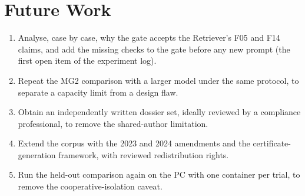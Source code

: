 \section{Future Work}
\begin{enumerate}[itemsep=1pt]
\item Analyse, case by case, why the gate accepts the Retriever's F05 and F14 claims, and add the
missing checks to the gate before any new prompt (the first open item of the experiment log).
\item Repeat the MG2 comparison with a larger model under the same protocol, to separate a capacity
limit from a design flaw.
\item Obtain an independently written dossier set, ideally reviewed by a compliance professional, to
remove the shared-author limitation.
\item Extend the corpus with the 2023 and 2024 amendments and the certificate-generation framework,
with reviewed redistribution rights.
\item Run the held-out comparison again on the PC with one container per trial, to remove the
cooperative-isolation caveat.
\end{enumerate}
